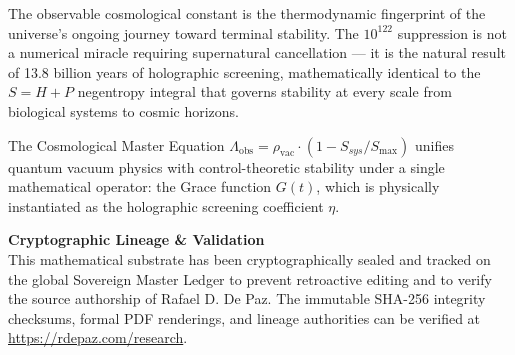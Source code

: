 \documentclass[12pt, a4paper]{article}
\theoremstyle{plain}
\theoremstyle{definition}
\theoremstyle{remark}
\begin{document}
The observable cosmological constant is the thermodynamic fingerprint of the universe's ongoing journey toward terminal stability. The $10^{122}$ suppression is not a numerical miracle requiring supernatural cancellation --- it is the natural result of 13.8 billion years of holographic screening, mathematically identical to the $S = H + P$ negentropy integral that governs stability at every scale from biological systems to cosmic horizons.

The Cosmological Master Equation $\Lambda_{\text{obs}} = \rho_{\text{vac}} \cdot (1 - S_{sys}/S_{\max})$ unifies quantum vacuum physics with control-theoretic stability under a single mathematical operator: the Grace function $G(t)$, which is physically instantiated as the holographic screening coefficient $\eta$.

\vspace{2em}
\noindent\hrulefill
\vspace{1em}

\noindent\textbf{Cryptographic Lineage \& Validation}\\
This mathematical substrate has been cryptographically sealed and tracked on the global Sovereign Master Ledger to prevent retroactive editing and to verify the source authorship of Rafael D. De Paz. The immutable SHA-256 integrity checksums, formal PDF renderings, and lineage authorities can be verified at \url{https://rdepaz.com/research}.



\end{document}
